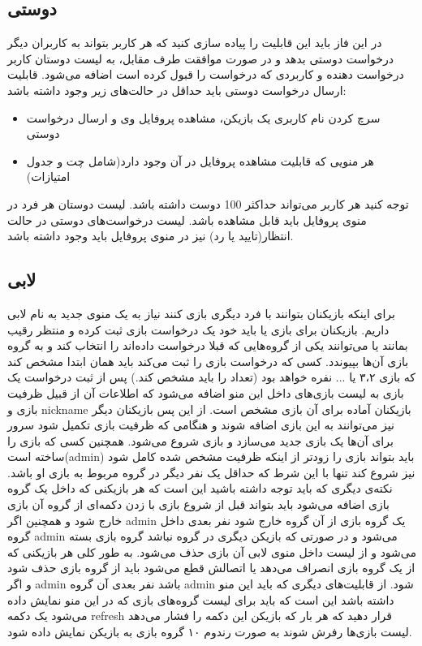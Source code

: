 \documentclass[]{article}
\begin{document}
\subsection*{{\titr دوستی}}
در این فاز باید این قابلیت را پیاده سازی کنید که هر کاربر بتواند به کاربران دیگر درخواست دوستی بدهد و در صورت موافقت طرف مقابل، به لیست دوستان کاربر درخواست دهنده و کاربردی که درخواست را قبول کرده است اضافه می‌شود. 
قابلیت ارسال درخواست دوستی باید حداقل در حالت‌های زیر وجود داشته باشد:
\begin{itemize}
    \item سرچ کردن نام کاربری یک بازیکن، مشاهده پروفایل وی و ارسال درخواست دوستی
    \item هر منویی که قابلیت مشاهده پروفایل در آن وجود دارد(شامل چت و جدول امتیازات)
\end{itemize}
 توجه کنید هر کاربر می‌تواند حداکثر 100 دوست داشته باشد. لیست دوستان هر فرد در منوی پروفایل باید قابل مشاهده باشد. لیست درخواست‌های دوستی در حالت انتظار(تایید یا رد) نیز در منوی پروفایل باید وجود داشته باشد.


\subsection*{{\titr لابی}}
برای اینکه بازیکنان بتوانند با فرد دیگری بازی کنند نیاز به یک منوی جدید به نام لابی داریم. بازیکنان برای بازی یا باید خود یک درخواست بازی ثبت کرده و منتظر رقیب بمانند یا می‌توانند یکی از گروه‌هایی که قبلا درخواست داده‌اند را انتخاب کند و به گروه بازی آن‌ها بپیوندد. کسی که درخواست بازی را ثبت می‌کند باید همان ابتدا مشخص کند که بازی ۳،۲ یا ... نفره خواهد بود (تعداد را باید مشخص کند.) پس از ثبت درخواست یک بازی به لیست بازی‌های داخل این منو اضافه می‌شود که اطلاعات آن از قبیل ظرفیت بازی و nickname بازیکنان آماده برای آن بازی مشخص است. از این پس بازیکنان دیگر نیز می‌توانند به این بازی اضافه شوند و هنگامی که ظرفیت بازی تکمیل شود سرور برای آن‌ها یک بازی جدید می‌سازد و بازی شروع می‌شود. همچنین کسی که بازی را ساخته است(admin) باید بتواند بازی را زودتر از اینکه ظرفیت مشخص شده کامل شود نیز شروع کند تنها با این شرط که حداقل یک نفر دیگر در گروه مربوط به بازی او باشد. نکته‌‌ی دیگری که باید توجه داشته باشید این است که هر بازیکنی که داخل یک گروه بازی اضافه می‌شود باید بتواند قبل از شروع بازی با زدن دکمه‌ای از گروه آن بازی خارج شود و همچنین اگر admin یک گروه بازی از آن گروه خارج شود نفر بعدی داخل گروه admin می‌شود و در صورتی که بازیکن دیگری در گروه نباشد گروه بازی بسته می‌شود و از لیست داخل منوی لابی آن بازی حذف می‌شود. به طور کلی هر بازیکنی که از یک گروه بازی انصراف می‌دهد یا اتصالش قطع می‌شود باید از گروه بازی حذف شود و اگر admin باشد نفر بعدی آن گروه admin شود.
از قابلیت‌های دیگری که باید این منو داشته باشد این است که باید برای لیست گروه‌های بازی که در این منو نمایش داده می‌شود یک دکمه refresh قرار دهید که هر بار که بازیکن این دکمه را فشار می‌دهد لیست بازی‌ها رفرش شوند به صورت رندوم ۱۰ گروه بازی به بازیکن نمایش داده شود.\\
\end{document}

